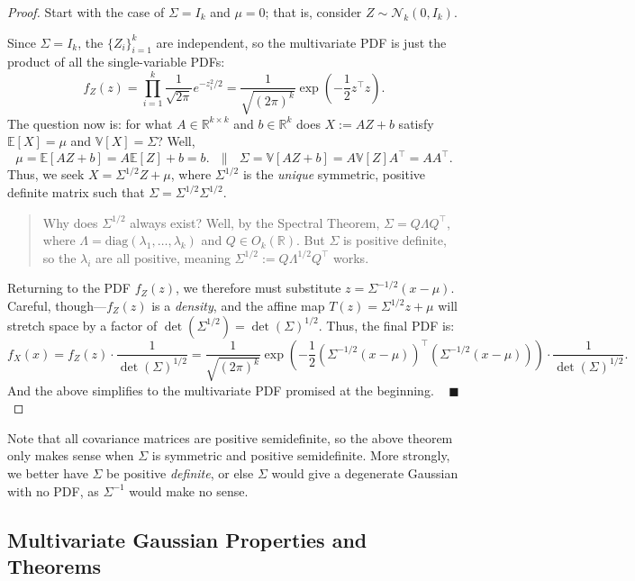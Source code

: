 \begin{proof}
    Start with the case of $\Sigma = I_k$ and $\mu = 0$; that is,
    consider $Z \sim \mathcal{N}_k(0, I_k)$.
    
    Since $\Sigma = I_k$, the $\{Z_i\}_{i = 1}^k$
    are independent, so the multivariate PDF is just the product of all the single-variable PDFs:
    \[ f_Z(z) = \prod_{i = 1}^k \frac{1}{\sqrt{2\pi}} e^{-z_i^2/2} =
    \frac{1}{\sqrt{(2\pi)^k}} \exp\left(-\frac{1}{2}z^{\top}z\right). \]
    The question now is: for what $A \in \mathbb{R}^{k \times k}$ and $b \in \mathbb{R}^k$
    does $X := AZ + b$ satisfy $\mathbb{E}[X] = \mu$ and $\mathbb{V}[X] = \Sigma$?  Well,
    \[ \mu = \mathbb{E}[AZ + b] = A\mathbb{E}[Z] + b = b. ~~~ \parallel ~~~
    \Sigma = \mathbb{V}[AZ + b] = A\mathbb{V}[Z]A^{\top} = AA^{\top}. \]
    Thus, we seek $X = \Sigma^{1/2}Z + \mu$, where $\Sigma^{1/2}$ is the
    \emph{unique} symmetric, positive definite matrix
    such that $\Sigma = \Sigma^{1/2}\Sigma^{1/2}$.
    \begin{quote}
        Why does $\Sigma^{1/2}$ always exist?  Well, by the Spectral Theorem,
        $\Sigma = Q \Lambda Q^{\top}$, where $\Lambda = \mathrm{diag}(\lambda_1, \dots, \lambda_k)$
        and $Q \in O_k(\mathbb{R})$.  But $\Sigma$ is positive definite,
        so the $\lambda_i$ are all positive,
        meaning $\Sigma^{1/2} := Q \Lambda^{1/2} Q^{\top}$ works.
    \end{quote}
    Returning to the PDF $f_Z(z)$, we therefore must substitute $z = \Sigma^{-1/2}(x - \mu)$.
    Careful, though---$f_Z(z)$ is a \emph{density}, and the affine map
    $T(z) = \Sigma^{1/2}z + \mu$ will stretch space by a factor of
    $\det(\Sigma^{1/2}) = \det(\Sigma)^{1/2}$.
    Thus, the final PDF is:
    \[ f_X(x) = f_Z(z) \cdot \frac{1}{\det(\Sigma)^{1/2}}
    = \frac{1}{\sqrt{(2\pi)^k}} \exp\left(-\frac{1}{2}(\Sigma^{-1/2}(x - \mu))^{\top}
    (\Sigma^{-1/2}(x - \mu))\right) \cdot \frac{1}{\det(\Sigma)^{1/2}}. \]
    And the above simplifies to the multivariate PDF promised at the beginning. ~ $\blacksquare$
\end{proof}

Note that all covariance matrices are positive semidefinite,
so the above theorem only makes sense when $\Sigma$
is symmetric and positive semidefinite.
More strongly, we better have $\Sigma$ be positive \emph{definite},
or else $\Sigma$ would give a degenerate Gaussian with no PDF,
as $\Sigma^{-1}$ would make no sense.

\subsection{Multivariate Gaussian Properties and Theorems}

